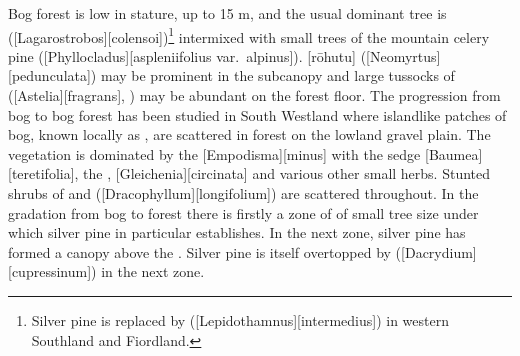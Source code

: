 Bog forest is low in stature, up to 15 m, and the usual dominant tree is  ([Lagarostrobos][colensoi])\footnote{Silver pine is replaced by  ([Lepidothamnus][intermedius]) in western Southland and Fiordland.} intermixed with small trees of the mountain celery pine ([Phyllocladus][aspleniifolius var.\ alpinus]).
[rōhutu] ([Neomyrtus][pedunculata]) may be prominent in the subcanopy and large tussocks of  ([Astelia][fragrans], ) may be abundant on the forest floor.
The progression from bog to bog forest has been studied in South Westland where islandlike patches of bog, known locally as , are scattered in forest on the lowland gravel plain.
The  vegetation is dominated by the  [Empodisma][minus] with the sedge [Baumea][teretifolia], the , [Gleichenia][circinata] and various other small herbs.
Stunted shrubs of  and  ([Dracophyllum][longifolium]) are scattered throughout.
In the gradation from bog to forest there is firstly a zone of  of small tree size under which silver pine in particular establishes.
In the next zone, silver pine has formed a canopy above the .
Silver pine is itself overtopped by  ([Dacrydium][cupressinum]) in the next zone.

